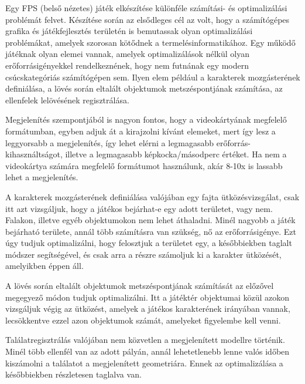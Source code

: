 \label{Chap:bevezetes}

Egy FPS (belső nézetes) játék elkészítése különféle számítási- és optimalizálási problémát felvet. Készítése során az elsődleges cél az volt, hogy a számítógépes grafika és játékfejlesztés területén is bemutassak olyan optimalizálási problémákat, amelyek szorosan kötődnek a termelésinformatikához. Egy működő játéknak olyan elemei vannak, amelyek optimalizálások nélkül olyan erőforrásigényekkel rendelkeznének, hogy nem futnának egy modern csúcskategóriás számítógépen sem. Ilyen elem például a karakterek mozgásterének definiálása, a lövés során eltalált objektumok metszéspontjának számítása, az ellenfelek lelövésének regisztrálása. 

Megjelenítés szempontjából is nagyon fontos, hogy a videokártyának megfelelő formátumban, egyben adjuk át a kirajzolni kívánt elemeket, mert így lesz a leggyorsabb a megjelenítés, így lehet elérni a legmagasabb erőforrás-kihasználtságot, illetve a legmagasabb képkocka/másodperc értéket. Ha nem a videokártya számára megfelelő formátumot használunk, akár 8-10x is lassabb lehet a megjelenítés.

A karakterek mozgásterének definiálása valójában egy fajta ütközésvizsgálat, csak itt azt vizsgáljuk, hogy a játékos bejárhat-e egy adott területet, vagy nem. Falakon, illetve egyéb objektumokon nem lehet áthaladni. Minél nagyobb a játék bejárható területe, annál több számításra van szükség, nő az erőforrásigénye. Ezt úgy tudjuk optimalizálni, hogy felosztjuk a területet egy, a későbbiekben taglalt módszer segítségével, és csak arra a részre számoljuk ki a karakter ütközését, amelyikben éppen áll.

A lövés során eltalált objektumok metszéspontjának számítását az előzővel megegyező módon tudjuk optimalizálni. Itt a játéktér objektumai közül azokon vizsgáljuk végig az ütközést, amelyek a játékos karakterének irányában vannak, lecsökkentve ezzel azon objektumok számát, amelyeket figyelembe kell venni.

Találatregisztrálás valójában nem közvetlen a megjelenített modellre történik. Minél több ellenfél van az adott pályán, annál lehetetlenebb lenne valós időben kiszámolni a találatot a megjelenített geometriára. Ennek az optimalizálása a későbbiekben részletesen taglalva van.

